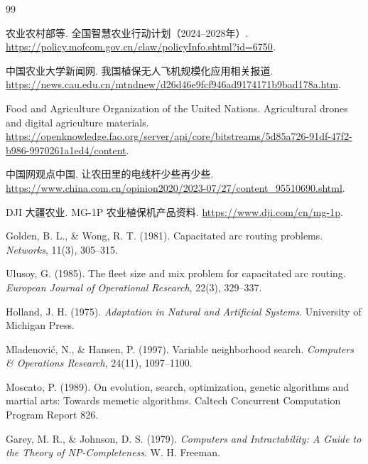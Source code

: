 \documentclass[UTF8,a4paper,12pt]{ctexart}
\begin{document}
\begin{thebibliography}{99}

农业农村部等.
全国智慧农业行动计划（2024--2028年）.
\url{https://policy.mofcom.gov.cn/claw/policyInfo.shtml?id=6750}.

中国农业大学新闻网.
我国植保无人飞机规模化应用相关报道.
\url{https://news.cau.edu.cn/mtndnew/d26d46e9fcf946ad9174171b9bad178a.htm}.

Food and Agriculture Organization of the United Nations.
Agricultural drones and digital agriculture materials.
\url{https://openknowledge.fao.org/server/api/core/bitstreams/5d85a726-91df-47f2-b986-9970261a1ed4/content}.

中国网观点中国.
让农田里的电线杆少些再少些.
\url{https://www.china.com.cn/opinion2020/2023-07/27/content_95510690.shtml}.

DJI 大疆农业.
MG-1P 农业植保机产品资料.
\url{https://www.dji.com/cn/mg-1p}.

Golden, B. L., \& Wong, R. T. (1981).
Capacitated arc routing problems.
\textit{Networks}, 11(3), 305--315.

Ulusoy, G. (1985).
The fleet size and mix problem for capacitated arc routing.
\textit{European Journal of Operational Research}, 22(3), 329--337.

Holland, J. H. (1975).
\textit{Adaptation in Natural and Artificial Systems}.
University of Michigan Press.

Mladenovi{\'c}, N., \& Hansen, P. (1997).
Variable neighborhood search.
\textit{Computers \& Operations Research}, 24(11), 1097--1100.

Moscato, P. (1989).
On evolution, search, optimization, genetic algorithms and martial arts: Towards memetic algorithms.
Caltech Concurrent Computation Program Report 826.

Garey, M. R., \& Johnson, D. S. (1979).
\textit{Computers and Intractability: A Guide to the Theory of NP-Completeness}.
W. H. Freeman.

\end{thebibliography}
\end{document}
